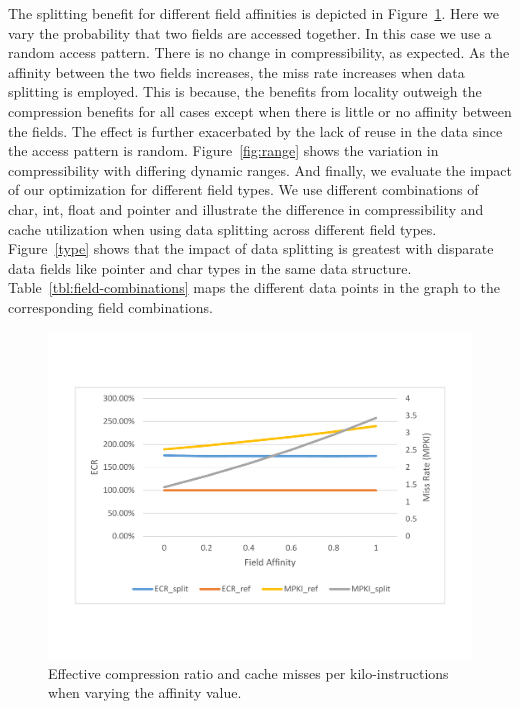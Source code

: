 The splitting benefit for different field affinities is depicted in
Figure~\ref{fig:affinity}.  Here we vary the probability that two fields are
accessed together. In this case we use a random access pattern. There is no
change in compressibility, as expected. As the affinity between the two fields
increases, the miss rate increases when data splitting is employed. This is
because, the benefits from locality outweigh the compression benefits for all
cases except when there is little or no affinity between the fields. The effect
is further exacerbated by the lack of reuse in the data since the access pattern
is random. Figure~\ref{fig:range} shows the variation in compressibility with
differing dynamic ranges. And finally, we evaluate the impact of our
optimization for different field types. We use different combinations of char,
int, float and pointer and illustrate the difference in compressibility and
cache utilization when using data splitting across different field types.
Figure~\ref{type} shows that the impact of data splitting is greatest with
disparate data fields like pointer and char types in the same data structure.
Table~\ref{tbl:field-combinations} maps the different data points in the graph
to the corresponding field combinations. 

\begin{figure}[htb]
\centering
\includegraphics[trim=0mm 0mm 0mm 0mm,clip,width=1\linewidth]{figs/figure.pdf}
\caption{Effective compression ratio and cache misses per kilo-instructions when
varying the affinity value.}
\label{fig:affinity}
\end{figure}

